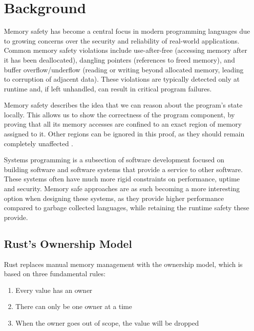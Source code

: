 \chapter{Background}
\label{chap:background}

Memory safety has become a central focus in modern programming languages due to growing concerns over the security and reliability of real-world applications. Common memory safety violations include use-after-free (accessing memory after it has been deallocated), dangling pointers (references to freed memory), and buffer overflow/underflow (reading or writing beyond allocated memory, leading to corruption of adjacent data). These violations are typically detected only at runtime and, if left unhandled, can result in critical program failures.

Memory safety describes the idea that we can reason about the program’s state locally. This allows us to show the correctness of the program component, by proving that all its memory accesses are confined to an exact region of memory assigned to it. Other regions can be ignored in this proof, as they should remain completely unaffected \cite[]{dhurjatiMemorySafetyRuntime} \cite[]{bauerPrinciplesSecurityTrust2018}.

Systems programming is a subsection of software development focused on building software and software systems that provide a service to other software. These systems often have much more rigid constraints on performance, uptime and security. Memory safe approaches are as such becoming a more interesting option when designing these systems, as they provide higher performance compared to garbage collected languages, while retaining the runtime safety these provide.

\section{Rust’s Ownership Model}

Rust replaces manual memory management with the ownership model, which is based on three fundamental rules:

\begin{enumerate}[noitemsep]
    \item Every value has an owner
    \item There can only be one owner at a time
    \item When the owner goes out of scope, the value will be dropped \cite[Section 4.1]{RustBook}
\end{enumerate}

